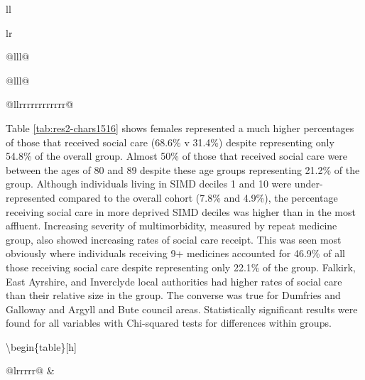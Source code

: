 \documentclass[12pt,a4paper,oneside,table]{report}
\begin{document}
\begin{tabular}[t]{ll}
\begin{tabular}{lr}
{\begin{tabular}{@{}lll@{}}
\begin{tabular}{@{}lll@{}}
\begin{tabular}{@{}llrrrrrrrrrrrr@{}}
{Table \ref{tab:res2-chars1516} shows females represented a much higher
percentages of those that received social care (68.6\% v 31.4\%) despite
representing only 54.8\% of the overall group. Almost 50\% of those that
received social care were between the ages of 80 and 89 despite these
age groups representing 21.2\% of the group. Although individuals living
in SIMD deciles 1 and 10 were under-represented compared to the overall
cohort (7.8\% and 4.9\%), the percentage receiving social care in more
deprived SIMD deciles was higher than in the most affluent. Increasing
severity of multimorbidity, measured by repeat medicine group, also
showed increasing rates of social care receipt. This was seen most
obviously where individuals receiving 9+ medicines accounted for 46.9\%
of all those receiving social care despite representing only 22.1\% of
the group. Falkirk, East Ayrshire, and Inverclyde local authorities had
higher rates of social care than their relative size in the group. The
converse was true for Dumfries and Galloway and Argyll and Bute council
areas. Statistically significant results were found for all variables
with Chi-squared tests for differences within groups.

\textbackslash{}begin\{table\}{[}h{]} \footnotesize \centering

\begin{tabular}{@{}lrrrrr@{}}
\toprule
 & 
\end{tabular}}
\end{tabular}
\end{tabular}
\end{tabular}}
\end{tabular}
\end{tabular}
\end{document}
